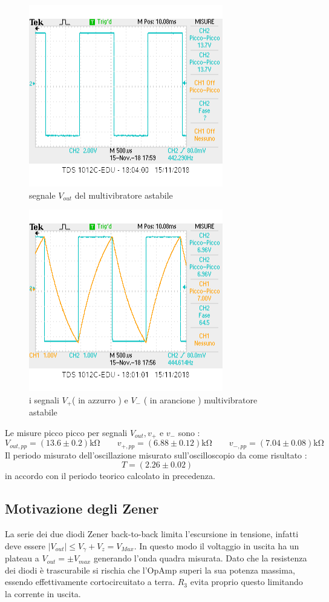 \documentclass[10pt,a4paper]{article}
\begin{document}
 \begin{figure}[h]
 	\centering
 		\includegraphics[scale=0.8]{vout_punto2.png}
 		\caption{\small segnale $V_{out}$ del multivibratore astabile }
 		\label{fig:V_out}
 \end{figure}
 
 \begin{figure}[h]
 	\centering
 		\includegraphics[scale=0.8]{v+_v-.png}
 		\caption{\small i segnali $V_+$( in azzurro ) e $ V_-$ ( in arancione )  multivibratore astabile}
 		\label{fig:V+V-}
 \end{figure}
Le misure picco picco per  segnali  $V_{out}, v_{+}$ e $v_{-}$ sono :
\[ V_{out,pp}= (13.6\pm 0.2)\si{\kilo\ohm} \qquad  v_{+,pp}= (6.88 \pm 0.12)\si{\kilo\ohm} \qquad   v_{-,pp}= ( 7.04 \pm0.08 ) \si{\kilo\ohm}\]
Il periodo misurato dell'oscillazione misurato sull'oscilloscopio da come risultato :
\[ T = (2.26 \pm 0.02)\]
in accordo con il periodo teorico calcolato in precedenza.

\subsection{Motivazione degli Zener} 
La serie dei due  diodi  Zener back-to-back limita l'escursione in tensione, infatti deve essere $|V_{out}| \le V_{\gamma} +V_{z} = V_{Max}$. In questo modo il voltaggio in uscita ha un plateau a $V_{out} = \pm V_{max}$ generando l'onda quadra misurata. Dato che la resistenza dei diodi è trascurabile si rischia che l'OpAmp superi la sua potenza massima, essendo effettivamente cortocircuitato a terra. $R_3$ evita proprio questo limitando la corrente in uscita.
\end{document}
